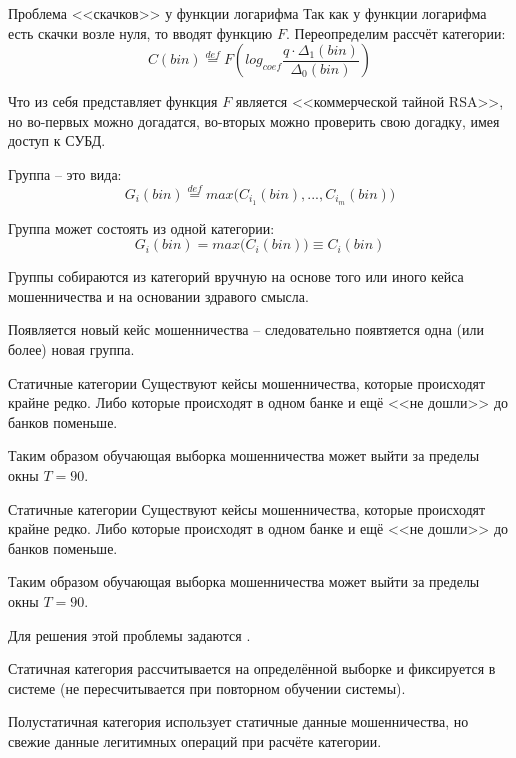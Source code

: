 \begin{frame}{Проблема <<скачков>> у функции логарифма}
	Так как у функции логарифма есть скачки возле нуля, то вводят  функцию $F$. Переопределим рассчёт категории:
	\begin{equation}
	C(bin) \stackrel{def}{=} F \left( log_{coef} \frac{q \cdot \Delta_1 (bin)}{\Delta_0 (bin)} \right)
	\end{equation}
	
	Что из себя представляет функция $F$ является <<коммерческой тайной RSA>>, 
	но во-первых можно догадатся, во-вторых можно проверить свою догадку, имея доступ к СУБД.
	
\end{frame}

\begin{frame}{Группа}
	 -- это 
	вида:
	\begin{equation}\label{eq:group}
		G_i (bin) \stackrel{def}{=} max \big( C_{i_1}(bin), ..., C_{i_m}(bin) \big)
	\end{equation}
	
	Группа может состоять из одной категории:
	\begin{equation*}
	G_i (bin) = max \big( C_{i}(bin) \big) \equiv C_{i}(bin)
	\end{equation*}
	
	Группы собираются из категорий вручную на основе того или иного кейса мошенничества
	и на основании здравого смысла.
	
	Появляется новый кейс мошенничества -- следовательно появтяется одна (или более) новая группа.
\end{frame}

\begin{frame}{Статичные категории}
	Существуют кейсы мошенничества, которые происходят крайне редко. Либо которые происходят в одном банке и ещё <<не дошли>> до банков поменьше. 
	
	Таким образом обучающая выборка мошенничества может выйти за пределы окны $T=90$. 
	
\end{frame}

\begin{frame}{Статичные категории}
	\small
	Существуют кейсы мошенничества, которые происходят крайне редко. Либо которые происходят в одном банке и ещё <<не дошли>> до банков поменьше. 
	
	Таким образом обучающая выборка мошенничества может выйти за пределы окны $T=90$. 
	
	Для решения этой проблемы задаются .
	
	Статичная категория рассчитывается на определённой выборке и фиксируется в системе 
	(не пересчитывается при повторном обучении системы).
	
	Полустатичная категория использует статичные данные мошенничества, но свежие данные
	легитимных операций при расчёте категории.
\end{frame}

